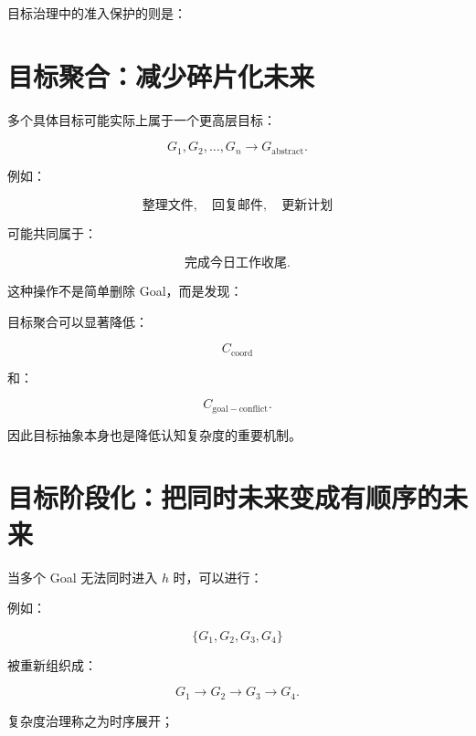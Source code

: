目标治理中的准入保护的则是：

\begin{statementbox}
\centering
{}
\end{statementbox}


\section{目标聚合：减少碎片化未来}

多个具体目标可能实际上属于一个更高层目标：

\[
G_1,G_2,\dots,G_n
\rightarrow
G_{\mathrm{abstract}}.
\]

例如：

\[
\text{整理文件},
\quad
\text{回复邮件},
\quad
\text{更新计划}
\]

可能共同属于：

\[
\text{完成今日工作收尾}.
\]

这种操作不是简单删除 Goal，而是发现：

\begin{statementbox}
\centering
{}
\end{statementbox}

目标聚合可以显著降低：

\[
C_{\mathrm{coord}}
\]

和：

\[
C_{\mathrm{goal-conflict}}.
\]

因此目标抽象本身也是降低认知复杂度的重要机制。


\section{目标阶段化：把同时未来变成有顺序的未来}

当多个 Goal 无法同时进入 $h$ 时，可以进行：

\begin{statementbox}
\centering
{}
\end{statementbox}

例如：

\[
\{G_1,G_2,G_3,G_4\}
\]

被重新组织成：

\[
G_1
\rightarrow
G_2
\rightarrow
G_3
\rightarrow
G_4.
\]

复杂度治理称之为时序展开；


